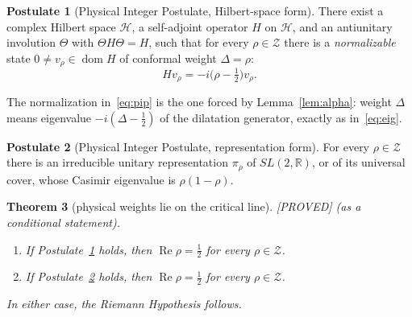 \documentclass[11pt,a4paper]{article}
\theoremstyle{plain}
\newtheorem{theorem}{Theorem}[section]
\theoremstyle{definition}
\newtheorem{postulate}[theorem]{Postulate}
\theoremstyle{remark}
\newcommand{\R}{\mathbb{R}}
\newcommand{\cH}{\mathcal{H}}
\newcommand{\lab}[1]{\textsf{\small[#1]}}
\newcommand{\PROVED}{\lab{PROVED}}
\renewcommand{\Re}{\operatorname{Re}}
\begin{document}
\begin{postulate}[Physical Integer Postulate, Hilbert-space form]\label{pip}
There exist a complex Hilbert space $\cH$, a self-adjoint operator $H$ on
$\cH$, and an antiunitary involution $\Theta$ with $\Theta H\Theta=H$, such
that for every $\rho\in\mathcal Z$ there is a \emph{normalizable} state
$0\ne v_\rho\in\operatorname{dom}H$ of conformal weight $\Delta=\rho$:
\begin{equation}\label{eq:pip}
H v_\rho=-i\bigl(\rho-\tfrac12\bigr)v_\rho .
\end{equation}
\end{postulate}
\noindent
The normalization in~\eqref{eq:pip} is the one forced by Lemma~\ref{lem:alpha}:
weight $\Delta$ means eigenvalue $-i(\Delta-\tfrac12)$ of the dilatation
generator, exactly as in~\eqref{eq:eig}.

\begin{postulate}[Physical Integer Postulate, representation form]\label{pipR}
For every $\rho\in\mathcal Z$ there is an irreducible unitary representation
$\pi_\rho$ of $SL(2,\R)$, or of its universal cover, whose Casimir eigenvalue is
$\rho(1-\rho)$.
\end{postulate}

\begin{theorem}[physical weights lie on the critical line]\label{thm:main}
\PROVED{} (as a conditional statement).
\begin{enumerate}[label=(\alph*)]
\item If Postulate~\ref{pip} holds, then $\Re\rho=\tfrac12$ for every
$\rho\in\mathcal Z$.
\item If Postulate~\ref{pipR} holds, then $\Re\rho=\tfrac12$ for every
$\rho\in\mathcal Z$.
\end{enumerate}
In either case, the Riemann Hypothesis follows.
\end{theorem}
\end{document}
